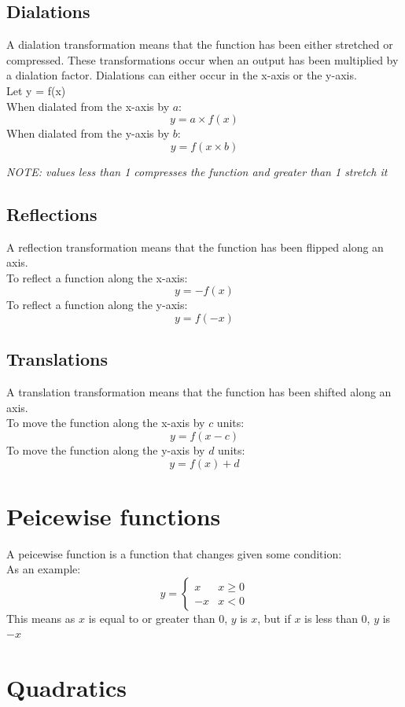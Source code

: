 \documentclass[a4paper,10pt]{report}
\begin{document}
\subsection{Dialations}
A dialation transformation means that the function has been either stretched or compressed.  These transformations occur when an output has been multiplied by a dialation factor.  Dialations can either occur in the x-axis or the y-axis.\\
Let y = f(x)\\
When dialated from the x-axis by $a$:
$$
	y = a \times f(x)
$$
When dialated from the y-axis by $b$:
$$
	y = f(x \times b)
$$
\begin{center}
	\emph{NOTE:  values less than 1 compresses the function and greater than 1 stretch it}
\end{center}

\subsection{Reflections}
A reflection transformation means that the function has been flipped along an axis.\\
To reflect a function along the x-axis:
$$
	y = -f(x)
$$
To reflect a function along the y-axis:
$$
	y = f(-x)
$$

\subsection{Translations}
A translation transformation means that the function has been shifted along an axis.\\
To move the function along the x-axis by $c$ units:
$$
	y = f(x - c)
$$
To move the function along the y-axis by $d$ units:
$$
	y = f(x) + d
$$

\section{Peicewise functions}
A peicewise function is a function that changes given some condition:\\
As an example:
$$
	y = \begin{cases}
		x  & x \geq 0 \\
		-x & x < 0
	\end{cases}
$$
This means as $x$ is equal to or greater than 0, $y$ is $x$, but if $x$ is less than 0, $y$ is $-x$

\section{Quadratics}
\end{document}
